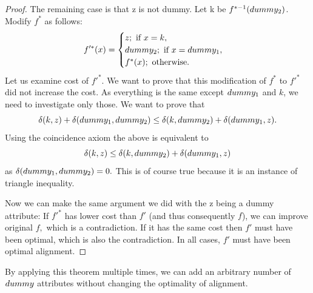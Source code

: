 \begin{theorem}
\begin{proof}
		The remaining case is that z is not dummy. Let k be $f^{*-1}(dummy_2)$. Modify $f^*$ as follows:
		\begin{equation*}
		f'^*(x)=
		\begin{cases}
		z; \mbox{ if } x = k, \\
		dummy_2; \mbox{ if } x = dummy_1, \\
		f^*(x); \mbox{ otherwise}.
		\end{cases}
		\end{equation*}
		Let us examine cost of $f'^*$. We want to prove that this modification of $f^*$ to $f'^*$ did not increase the cost. As everything is the same except $dummy_1$ and $k$, we need to investigate only those. We want to prove that $$\delta(k,z) + \delta(dummy_1, dummy_2) \le \delta(k,dummy_2) + \delta(dummy_1, z).$$
		Using the coincidence axiom the above is equivalent to
		$$\delta(k,z) \le \delta(k,dummy_2) + \delta(dummy_1, z)$$
		as $\delta(dummy_1, dummy_2)=0.$ This is of course true because it is an instance of triangle inequality.
	
 Now we can make the same argument we did with the z being a dummy attribute: If $f'^*$ has lower cost than $f'$ (and thus consequently $f$), we can improve original $f,$ which is a contradiction. If it has the same cost then $f'$ must have been optimal, which is also the contradiction. In all cases, $f'$ must have been optimal alignment.
	\end{proof}
\end{theorem}
By applying this theorem multiple times, we can add an arbitrary number of $dummy$ attributes without changing the optimality of alignment.
